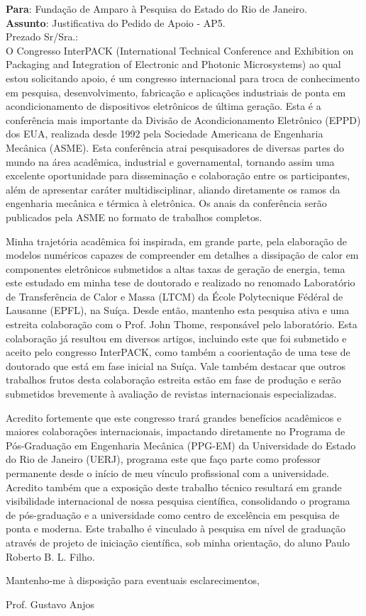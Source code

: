 \documentclass[12pt,a4paper]{article}
\begin{document}
\vspace*{1.5cm}
\noindent \textbf{Para}: Fundação de Amparo à Pesquisa do Estado do Rio
de Janeiro.\\
\noindent \textbf{Assunto}: Justificativa do Pedido de Apoio - AP5.\\

\noindent Prezado Sr/Sra.:\\

O Congresso InterPACK (International Technical Conference and Exhibition
on Packaging and Integration of Electronic and Photonic Microsystems) ao
qual estou solicitando apoio, é um congresso internacional para troca de
conhecimento em pesquisa, desenvolvimento, fabricação e aplicações
industriais de ponta em acondicionamento de dispositivos eletrônicos de
última geração. Esta é a conferência mais importante da Divisão de
Acondicionamento Eletrônico (EPPD) dos EUA, realizada desde 1992 pela
Sociedade Americana de Engenharia Mecânica (ASME). Esta conferência
atrai pesquisadores de diversas partes do mundo na área acadêmica,
industrial e governamental, tornando assim uma excelente oportunidade
para disseminação e colaboração entre os participantes, além de
apresentar caráter multidisciplinar, aliando diretamente os ramos da
engenharia mecânica e térmica à eletrônica. Os anais da conferência
serão publicados pela ASME no formato de trabalhos completos.

Minha trajetória acadêmica foi inspirada, em grande parte, pela
elaboração de modelos numéricos capazes de compreender em detalhes a
dissipação de calor em componentes eletrônicos submetidos a altas taxas
de geração de energia, tema este estudado em minha tese de doutorado e
realizado no renomado Laboratório de Transferência de Calor e Massa
(LTCM) da École Polytecnique Fédéral de Lausanne (EPFL), na Suíça. Desde
então, mantenho esta pesquisa ativa e uma estreita colaboração com o
Prof. John Thome, responsável pelo laboratório. Esta colaboração já
resultou em diversos artigos, incluindo este que foi submetido e aceito
pelo congresso InterPACK, como também a coorientação de uma tese de
doutorado que está em fase inicial na Suíça. Vale também destacar que
outros trabalhos frutos desta colaboração estreita estão em fase de
produção e serão submetidos brevemente à avaliação de revistas
internacionais especializadas.

Acredito fortemente que este congresso trará grandes benefícios
acadêmicos e maiores colaborações internacionais, impactando diretamente
no Programa de Pós-Graduação em Engenharia Mecânica (PPG-EM) da
Universidade do Estado do Rio de Janeiro (UERJ), programa este que faço
parte como professor permanente desde o início de meu vínculo
profissional com a universidade. Acredito também que a exposição deste
trabalho técnico resultará em grande visibilidade internacional de nossa
pesquisa científica, consolidando o programa de pós-graduação e a
universidade como centro de excelência em pesquisa de ponta e moderna.
Este trabalho é vinculado à pesquisa em nível de graduação através de
projeto de iniciação científica, sob minha orientação, do aluno Paulo
Roberto B. L. Filho.

\vspace{2cm}

\noindent Mantenho-me à disposição para eventuais esclarecimentos,

\vspace{2cm}

\begin{center}
Prof. Gustavo Anjos
\end{center}
\end{document}
